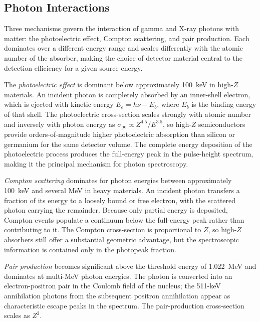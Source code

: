 \subsection{Photon Interactions}

Three mechanisms govern the interaction of gamma and X-ray photons with
matter: the photoelectric effect, Compton scattering, and pair production.
Each dominates over a different energy range and scales differently with
the atomic number of the absorber, making the choice of detector material
central to the detection efficiency for a given source energy.

The \emph{photoelectric effect} is dominant below approximately 100~keV
in high-$Z$ materials.  An incident photon is completely absorbed by an
inner-shell electron, which is ejected with kinetic energy $E_e = h\nu - E_b$,
where $E_b$ is the binding energy of that shell.  The photoelectric
cross-section scales strongly with atomic number and inversely with photon
energy as $\sigma_{\mathrm{pe}} \propto Z^{4.5}/E^{3.5}$, so high-$Z$
semiconductors provide orders-of-magnitude higher photoelectric absorption
than silicon or germanium for the same detector volume.  The complete
energy deposition of the photoelectric process produces the full-energy
peak in the pulse-height spectrum, making it the principal mechanism for
photon spectroscopy.

\emph{Compton scattering} dominates for photon energies between
approximately 100~keV and several MeV in heavy materials.  An incident
photon transfers a fraction of its energy to a loosely bound or free
electron, with the scattered photon carrying the remainder.  Because
only partial energy is deposited, Compton events populate a continuum
below the full-energy peak rather than contributing to it.  The Compton
cross-section is proportional to $Z$, so high-$Z$ absorbers still offer
a substantial geometric advantage, but the spectroscopic information is
contained only in the photopeak fraction.

\emph{Pair production} becomes significant above the threshold energy of
1.022~MeV and dominates at multi-MeV photon energies.  The photon is
converted into an electron-positron pair in the Coulomb field of the
nucleus; the 511-keV annihilation photons from the subsequent positron
annihilation appear as characteristic escape peaks in the spectrum.
The pair-production cross-section scales as $Z^2$.

